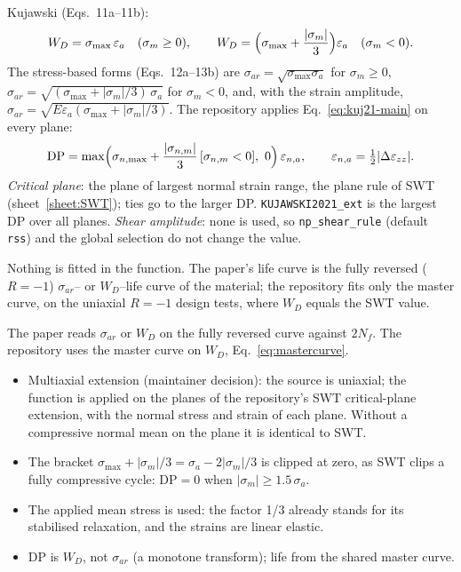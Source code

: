  Kujawski (Eqs.~11a--11b):
\begin{equation}
W_D = \sigma_{\max}\,\varepsilon_a \quad (\sigma_m\ge0),\qquad
W_D = \Bigl(\sigma_{\max}+\frac{\lvert\sigma_m\rvert}{3}\Bigr)\varepsilon_a \quad (\sigma_m<0) .
\label{eq:kuj21-main}
\end{equation}
The stress-based forms (Eqs.~12a--13b) are
$\sigma_{ar}=\sqrt{\sigma_{\max}\sigma_a}$ for $\sigma_m\ge0$,
$\sigma_{ar}=\sqrt{(\sigma_{\max}+\lvert\sigma_m\rvert/3)\,\sigma_a}$ for $\sigma_m<0$, and, with
the strain amplitude, $\sigma_{ar}=\sqrt{E\varepsilon_a(\sigma_{\max}+\lvert\sigma_m\rvert/3)}$.
The repository applies Eq.~\eqref{eq:kuj21-main} on every plane:
\begin{equation}
\mathrm{DP} = \max\Bigl(\sigma_{n,\max}+\frac{\lvert\sigma_{n,m}\rvert}{3}\,[\sigma_{n,m}<0],\ 0\Bigr)\,\varepsilon_{n,a},
\qquad \varepsilon_{n,a}=\tfrac12\lvert\Delta\varepsilon_{zz}\rvert .
\label{eq:kuj21-plane}
\end{equation}
\emph{Critical plane}: the plane of largest normal strain range, the plane rule of SWT
(sheet~\ref{sheet:SWT}); ties go to the larger DP. \texttt{KUJAWSKI2021\_ext} is the largest DP over
all planes. \emph{Shear amplitude}: none is used, so \texttt{np\_shear\_rule} (default
\texttt{rss}) and the global selection do not change the value.

 Nothing is fitted in the function. The paper's life curve is the
fully reversed ($R=-1$) $\sigma_{ar}$-- or $W_D$--life curve of the material; the repository fits
only the master curve, on the uniaxial $R=-1$ design tests, where $W_D$ equals the SWT value.

 The paper reads $\sigma_{ar}$ or $W_D$ on the fully reversed curve against $2N_f$. The
repository uses the master curve on $W_D$, Eq.~\eqref{eq:mastercurve}.

\begin{itemize}
\item Multiaxial extension (maintainer decision): the source is uniaxial; the function is applied
  on the planes of the repository's SWT critical-plane extension, with the normal stress and strain
  of each plane. Without a compressive normal mean on the plane it is identical to SWT.
\item The bracket $\sigma_{\max}+\lvert\sigma_m\rvert/3=\sigma_a-2\lvert\sigma_m\rvert/3$ is clipped
  at zero, as SWT clips a fully compressive cycle: $\mathrm{DP}=0$ when
  $\lvert\sigma_m\rvert\ge1.5\,\sigma_a$.
\item The applied mean stress is used: the factor 1/3 already stands for its stabilised relaxation,
  and the strains are linear elastic.
\item DP is $W_D$, not $\sigma_{ar}$ (a monotone transform); life from the shared master curve.
\end{itemize}

